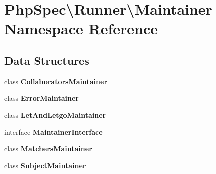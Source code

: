 \section{Php\+Spec\textbackslash{}Runner\textbackslash{}Maintainer Namespace Reference}
\label{namespace_php_spec_1_1_runner_1_1_maintainer}
\subsection*{Data Structures}
\begin{DoxyCompactItemize}
\item 
class {\bf Collaborators\+Maintainer}
\item 
class {\bf Error\+Maintainer}
\item 
class {\bf Let\+And\+Letgo\+Maintainer}
\item 
interface {\bf Maintainer\+Interface}
\item 
class {\bf Matchers\+Maintainer}
\item 
class {\bf Subject\+Maintainer}
\end{DoxyCompactItemize}
